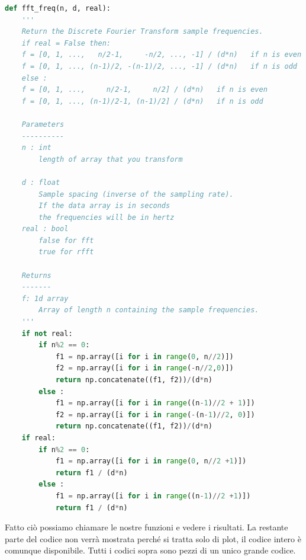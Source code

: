 \documentclass[10pt,a4paper]{article}
\begin{document}
\begin{lstlisting}[language=Python]
def fft_freq(n, d, real):
    '''
    Return the Discrete Fourier Transform sample frequencies.
    if real = False then:
    f = [0, 1, ...,   n/2-1,     -n/2, ..., -1] / (d*n)   if n is even
    f = [0, 1, ..., (n-1)/2, -(n-1)/2, ..., -1] / (d*n)   if n is odd
    else :
    f = [0, 1, ...,     n/2-1,     n/2] / (d*n)   if n is even
    f = [0, 1, ..., (n-1)/2-1, (n-1)/2] / (d*n)   if n is odd

    Parameters
    ----------
    n : int
        length of array that you transform

    d : float
        Sample spacing (inverse of the sampling rate).
        If the data array is in seconds
        the frequencies will be in hertz
    real : bool
        false for fft
        true for rfft

    Returns
    -------
    f: 1d array
        Array of length n containing the sample frequencies.
    '''
    if not real:
        if n%2 == 0:
            f1 = np.array([i for i in range(0, n//2)])
            f2 = np.array([i for i in range(-n//2,0)])
            return np.concatenate((f1, f2))/(d*n)
        else :
            f1 = np.array([i for i in range((n-1)//2 + 1)])
            f2 = np.array([i for i in range(-(n-1)//2, 0)])
            return np.concatenate((f1, f2))/(d*n)
    if real:
        if n%2 == 0:
            f1 = np.array([i for i in range(0, n//2 +1)])
            return f1 / (d*n)
        else :
            f1 = np.array([i for i in range((n-1)//2 +1)])
            return f1 / (d*n)
\end{lstlisting}
Fatto ciò possiamo chiamare le nostre funzioni e vedere i risultati. La restante parte del codice non verrà mostrata perché si tratta solo di plot, il codice intero è comunque disponibile. Tutti i codici sopra sono pezzi di un unico grande codice.
\end{document}
